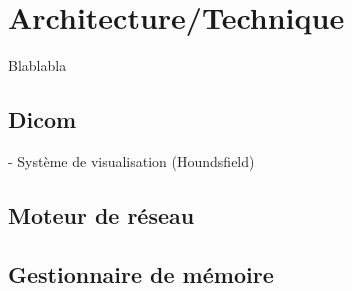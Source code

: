 \chapter{Architecture/Technique}

Blablabla

\section{Dicom}

- Système de visualisation (Houndsfield)

\section{Moteur de réseau}

\section{Gestionnaire de mémoire}
